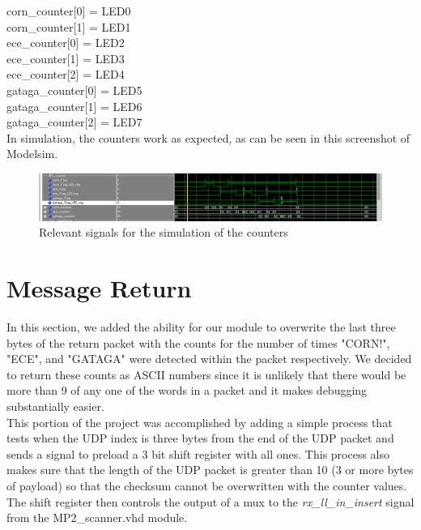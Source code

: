 \documentclass{article}
\begin{document}
corn\_counter[0] = LED0\\
corn\_counter[1] = LED1\\
ece\_counter[0] = LED2\\
ece\_counter[1] = LED3\\
ece\_counter[2] = LED4\\
gataga\_counter[0] = LED5\\
gataga\_counter[1] = LED6\\
gataga\_counter[2] = LED7\\

In simulation, the counters work as expected, as can be seen in this screenshot of Modelsim.

	\begin{figure}[H]
		\begin{center}
			\includegraphics[scale=0.35]{../part4_files/String_counter_sim.png}
			\caption{Relevant signals for the simulation of the counters}
		\end{center}
	\end{figure}

\section{Message Return}
In this section, we added the ability for our module to overwrite the last three bytes of the return packet with the counts for the number of times "CORN!", "ECE", and "GATAGA" were detected within the packet respectively. We decided to return these counts as ASCII numbers since it is unlikely that there would be more than 9 of any one of the words in a packet and it makes debugging substantially easier. \\

This portion of the project was accomplished by adding a simple process that tests when the UDP index is three bytes from the end of the UDP packet and sends a signal to preload a 3 bit shift register with all ones. This process also makes sure that the length of the UDP packet is greater than 10 (3 or more bytes of payload) so that the checksum cannot be overwritten with the counter values. The shift register then controls the output of a mux to the \textit{rx\_ll\_in\_insert} signal from the MP2\_scanner.vhd module. \\
\end{document}
